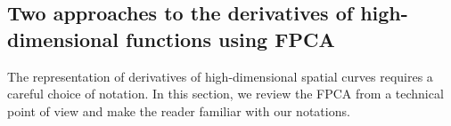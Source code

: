 


\subsection{Two approaches to the derivatives of high-dimensional functions using FPCA}
The representation of derivatives of high-dimensional spatial curves requires a careful choice of notation. In this section, we review the FPCA from a technical point of view and make the reader familiar with our notations. 

